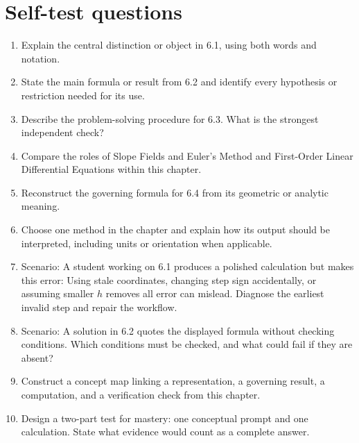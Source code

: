 \documentclass[11pt]{article}
\begin{document}
\section{Self-test questions}
\begin{enumerate}
\item Explain the central distinction or object in 6.1, using both words and notation.
\item State the main formula or result from 6.2 and identify every hypothesis or restriction needed for its use.
\item Describe the problem-solving procedure for 6.3. What is the strongest independent check?
\item Compare the roles of Slope Fields and Euler's Method and First-Order Linear Differential Equations within this chapter.
\item Reconstruct the governing formula for 6.4 from its geometric or analytic meaning.
\item Choose one method in the chapter and explain how its output should be interpreted, including units or orientation when applicable.
\item Scenario: A student working on 6.1 produces a polished calculation but makes this error: Using stale coordinates, changing step sign accidentally, or assuming smaller $h$ removes all error can mislead. Diagnose the earliest invalid step and repair the workflow.
\item Scenario: A solution in 6.2 quotes the displayed formula without checking conditions. Which conditions must be checked, and what could fail if they are absent?
\item Construct a concept map linking a representation, a governing result, a computation, and a verification check from this chapter.
\item Design a two-part test for mastery: one conceptual prompt and one calculation. State what evidence would count as a complete answer.
\end{enumerate}

\end{document}
